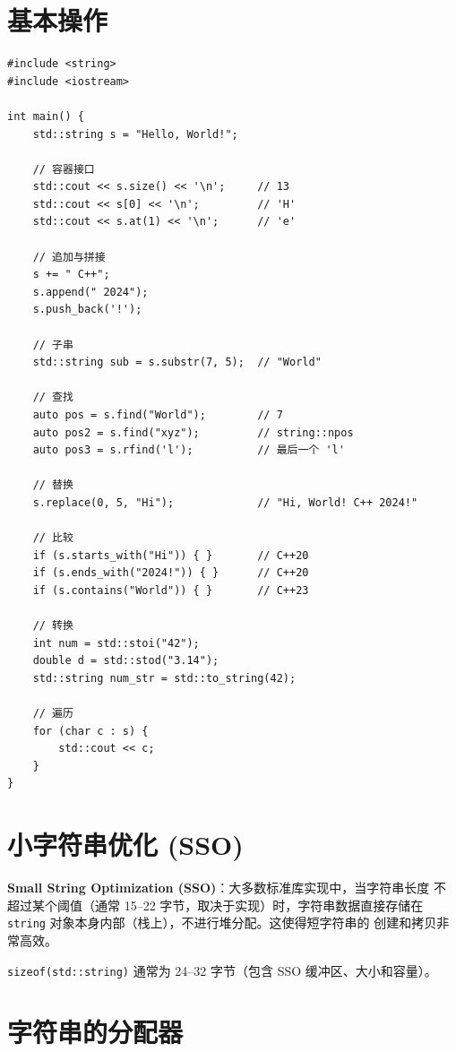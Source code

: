 \documentclass[12pt,a4paper,fontset=fandol]{ctexbook}
\begin{document}
\section{基本操作}

\begin{lstlisting}
#include <string>
#include <iostream>

int main() {
    std::string s = "Hello, World!";

    // 容器接口
    std::cout << s.size() << '\n';     // 13
    std::cout << s[0] << '\n';         // 'H'
    std::cout << s.at(1) << '\n';      // 'e'

    // 追加与拼接
    s += " C++";
    s.append(" 2024");
    s.push_back('!');

    // 子串
    std::string sub = s.substr(7, 5);  // "World"

    // 查找
    auto pos = s.find("World");        // 7
    auto pos2 = s.find("xyz");         // string::npos
    auto pos3 = s.rfind('l');          // 最后一个 'l'

    // 替换
    s.replace(0, 5, "Hi");             // "Hi, World! C++ 2024!"

    // 比较
    if (s.starts_with("Hi")) { }       // C++20
    if (s.ends_with("2024!")) { }      // C++20
    if (s.contains("World")) { }       // C++23

    // 转换
    int num = std::stoi("42");
    double d = std::stod("3.14");
    std::string num_str = std::to_string(42);

    // 遍历
    for (char c : s) {
        std::cout << c;
    }
}
\end{lstlisting}

\section{小字符串优化 (SSO)}

\begin{note}
\textbf{Small String Optimization (SSO)}：大多数标准库实现中，当字符串长度
不超过某个阈值（通常 15--22 字节，取决于实现）时，字符串数据直接存储在
\texttt{string} 对象本身内部（栈上），不进行堆分配。这使得短字符串的
创建和拷贝非常高效。

\texttt{sizeof(std::string)} 通常为 24--32 字节（包含 SSO 缓冲区、大小和容量）。
\end{note}

\section{字符串的分配器}
\end{document}
